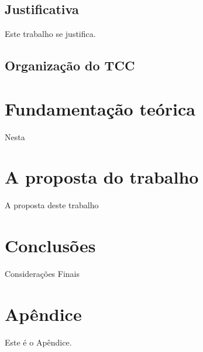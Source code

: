 \documentclass[eso]{bcc}
\begin{document}
\section{Justificativa}

Este trabalho se justifica.

\section{Organização do TCC}


\chapter{Fundamentação teórica}
\label{chap:fundamentacao}

Nesta

\chapter{A proposta do trabalho}
\label{chap:sistema}
A proposta deste trabalho

\chapter{Conclusões}
\label{chap:conclusao}

Considerações Finais


\nocite{*} %



\appendix
\chapter{Apêndice}\label{ane:relatorio}
Este é o Apêndice.
\end{document}
